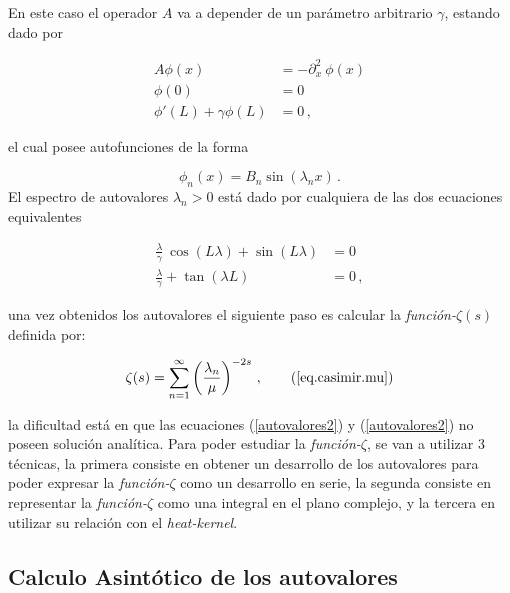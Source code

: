 En este caso el operador $A$ va a depender de un parámetro arbitrario $\gamma$, estando dado por

\begin{equation}
\begin{aligned}
    A \phi (x) &= - \partial ^2 _x \ \phi (x)  \\[5pt]
    \phi (0) &= 0 \\[5pt]
    \phi ' (L) + \gamma \phi (L) &= 0 \, ,
\end{aligned}
\end{equation}

el cual posee autofunciones de la forma

\begin{equation}
\phi _n (x) = 
B _n \sin ( \lambda _n x ) \, .
\end{equation}
El espectro de autovalores $\lambda _n > 0 $ está dado por  cualquiera de las dos ecuaciones equivalentes

\begin{align}
    \frac{\lambda}{\gamma}  \ \cos( L \lambda ) +   \sin( L \lambda ) &= 0 \label{autovalores2} \\[5pt]
    \frac{\lambda}{\gamma}  + \tan (\lambda L )  &= 0 \, , \label{autovalores}
\end{align}



una vez obtenidos los autovalores el siguiente paso es calcular la {\it función-$\zeta  (s) $} definida por:

\begin{equation}
    \zeta (s) =  \sum_{n = 1} ^{ \infty } \left( \frac{\lambda _n}{\mu } \right) ^ {-2 s} \, ,
    \tag{\ref{eq.casimir.mu}}
\end{equation}

la dificultad está en que las ecuaciones (\ref{autovalores2}) y (\ref{autovalores2}) no poseen solución analítica. Para poder estudiar la  {\it función-$\zeta$}, se van a utilizar 3 técnicas, la primera consiste en obtener un desarrollo de los autovalores para poder expresar la {\it función-$\zeta$} como un desarrollo en serie, la segunda consiste en representar la {\it función-$\zeta$} como una integral en el plano complejo, y la tercera en utilizar su relación con el {\it heat-kernel}. 

\subsection{Calculo Asintótico de los autovalores}{\label{seq.asin}}

